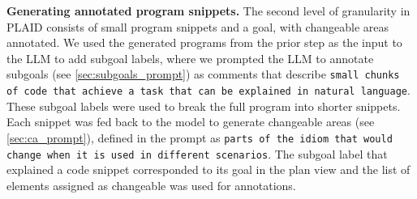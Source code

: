 \textbf{Generating annotated program snippets.}
The second level of granularity in PLAID consists of small program snippets and a goal, with changeable areas annotated. 
We used the generated programs from
the prior step as the input to the LLM to add subgoal labels, where we prompted the LLM to annotate subgoals (see \cref{sec:subgoals_prompt}) as comments that describe \texttt{small chunks of code that achieve a task that can be explained in natural language}. These subgoal labels were used to break the full program into shorter snippets. Each snippet was fed back to the model to generate changeable areas (see \cref{sec:ca_prompt}), defined in the prompt as \texttt{parts of the idiom that would change when it is used in different scenarios}. The subgoal label that explained a code snippet corresponded to its goal in the plan view and the list of elements assigned as changeable was used for annotations.




